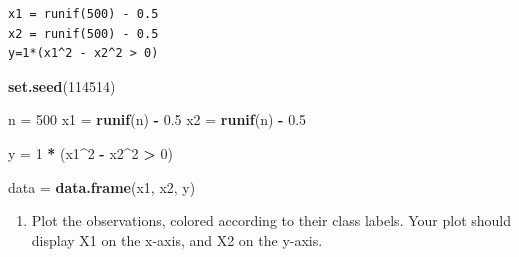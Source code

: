 \documentclass[
]{article}
\newenvironment{Shaded}{\begin{snugshade}}{\end{snugshade}}
\newcommand{\DecValTok}[1]{\textcolor[rgb]{0.00,0.00,0.81}{#1}}
\newcommand{\FloatTok}[1]{\textcolor[rgb]{0.00,0.00,0.81}{#1}}
\newcommand{\FunctionTok}[1]{\textcolor[rgb]{0.13,0.29,0.53}{\textbf{#1}}}
\newcommand{\NormalTok}[1]{#1}
\newcommand{\OtherTok}[1]{\textcolor[rgb]{0.56,0.35,0.01}{#1}}
\newcommand{\SpecialCharTok}[1]{\textcolor[rgb]{0.81,0.36,0.00}{\textbf{#1}}}
\providecommand{\tightlist}{%
  \setlength{\itemsep}{0pt}\setlength{\parskip}{0pt}}
\begin{document}
\begin{verbatim}
x1 = runif(500) - 0.5 
x2 = runif(500) - 0.5 
y=1*(x1^2 - x2^2 > 0)
\end{verbatim}

\begin{Shaded}
\begin{Highlighting}[]
\FunctionTok{set.seed}\NormalTok{(}\DecValTok{114514}\NormalTok{)}

\NormalTok{n }\OtherTok{=} \DecValTok{500}
\NormalTok{x1 }\OtherTok{=} \FunctionTok{runif}\NormalTok{(n) }\SpecialCharTok{{-}} \FloatTok{0.5}
\NormalTok{x2 }\OtherTok{=} \FunctionTok{runif}\NormalTok{(n) }\SpecialCharTok{{-}} \FloatTok{0.5}

\NormalTok{y }\OtherTok{=} \DecValTok{1} \SpecialCharTok{*}\NormalTok{ (x1}\SpecialCharTok{\^{}}\DecValTok{2} \SpecialCharTok{{-}}\NormalTok{ x2}\SpecialCharTok{\^{}}\DecValTok{2} \SpecialCharTok{\textgreater{}} \DecValTok{0}\NormalTok{)}

\NormalTok{data }\OtherTok{=} \FunctionTok{data.frame}\NormalTok{(x1, x2, y)}
\end{Highlighting}
\end{Shaded}

\begin{enumerate}
\def\labelenumi{(\alph{enumi})}
\setcounter{enumi}{1}
\tightlist
\item
  Plot the observations, colored according to their class labels. Your
  plot should display X1 on the x-axis, and X2 on the y-axis.
\end{enumerate}
\end{document}

